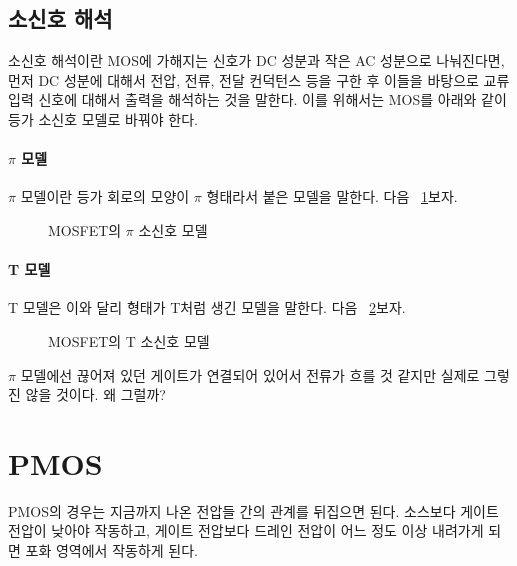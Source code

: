\subsection{소신호 해석}
소신호 해석이란 MOS에 가해지는 신호가 DC 성분과 작은 AC 성분으로 나눠진다면, 먼저 DC 성분에 대해서 전압, 전류, 전달 컨덕턴스 등을 구한 후 이들을 바탕으로 교류 입력 신호에 대해서 출력을 해석하는 것을 말한다.
이를 위해서는 MOS를 아래와 같이 등가 소신호 모델로 바꿔야 한다.
\paragraph{$\pi$ 모델}
$\pi$ 모델이란 등가 회로의 모양이 $\pi$ 형태라서 붙은 모델을 말한다. 다음 \figurename~\ref{fig:mos pi small signal model}\을 보자.
\begin{figure}[!hpb]
    \centering
    \caption{MOSFET의 $\pi$ 소신호 모델}\label{fig:mos pi small signal model}
\end{figure}
\paragraph{T 모델}
T 모델은 이와 달리 형태가 T처럼 생긴 모델을 말한다. 다음 \figurename~\ref{fig:mos t small signal model}\을 보자.
\begin{figure}[!hpb]
    \centering
    \caption{MOSFET의 T 소신호 모델}\label{fig:mos t small signal model}
\end{figure}
$\pi$ 모델에선 끊어져 있던 게이트가 연결되어 있어서 전류가 흐를 것 같지만 실제로 그렇진 않을 것이다. 왜 그럴까?

\section{PMOS}
PMOS의 경우는 지금까지 나온 전압들 간의 관계를 뒤집으면 된다. 소스보다 게이트 전압이 낮아야 작동하고, 게이트 전압보다 드레인 전압이 어느 정도 이상 내려가게 되면 포화 영역에서 작동하게 된다.
